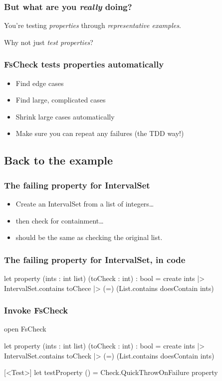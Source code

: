 \documentclass{beamer}
\begin{document}
\begin{frame}
\frametitle{But what are you \emph{really} doing?}

You're testing \emph{properties} through \emph{representative examples}.
\end{frame}

\begin{frame}
    Why not just \emph{test properties}?
\end{frame}

\begin{frame}
\frametitle{FsCheck tests properties automatically}

\begin{itemize}
    \item Find edge cases
    \item Find large, complicated cases
    \item Shrink large cases automatically
    \item Make sure you can repeat any failures (the TDD way!)
\end{itemize}
\end{frame}

\subsection{Back to the example}

\begin{frame}
\frametitle{The failing property for IntervalSet}
\begin{itemize}
\item Create an IntervalSet from a list of integers\dots
\item then check for containment\dots
\item should be the same as checking the original list.
\end{itemize}
\end{frame}

\begin{frame}[fragile]
\frametitle{The failing property for IntervalSet, in code}
\begin{fslisting}
let property (ints : int list) (toCheck : int) : bool =
    create ints
    |> IntervalSet.contains toChece
    |> (=) (List.contains doesContain ints)
\end{fslisting}

\end{frame}

\begin{frame}[fragile]
\frametitle{Invoke FsCheck}
\begin{fslisting}
open FsCheck

let property (ints : int list) (toCheck : int) : bool =
    create ints
    |> IntervalSet.contains toCheck
    |> (=) (List.contains doesContain ints)

[<Test>]
let testProperty () =
    Check.QuickThrowOnFailure property
\end{fslisting}

\end{frame}
\end{document}
